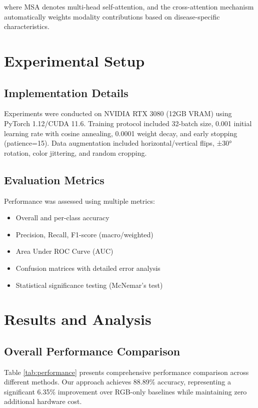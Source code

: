 \documentclass[conference]{IEEEtran}
\begin{document}
where MSA denotes multi-head self-attention, and the cross-attention mechanism automatically weights modality contributions based on disease-specific characteristics.

\section{Experimental Setup}

\subsection{Implementation Details}

Experiments were conducted on NVIDIA RTX 3080 (12GB VRAM) using PyTorch 1.12/CUDA 11.6. Training protocol included 32-batch size, 0.001 initial learning rate with cosine annealing, 0.0001 weight decay, and early stopping (patience=15). Data augmentation included horizontal/vertical flips, ±30° rotation, color jittering, and random cropping.

\subsection{Evaluation Metrics}

Performance was assessed using multiple metrics:
\begin{itemize}
    \item Overall and per-class accuracy
    \item Precision, Recall, F1-score (macro/weighted)
    \item Area Under ROC Curve (AUC)
    \item Confusion matrices with detailed error analysis
    \item Statistical significance testing (McNemar's test)
\end{itemize}

\section{Results and Analysis}

\subsection{Overall Performance Comparison}

Table \ref{tab:performance} presents comprehensive performance comparison across different methods. Our approach achieves 88.89\% accuracy, representing a significant 6.35\% improvement over RGB-only baselines while maintaining zero additional hardware cost.
\end{document}
